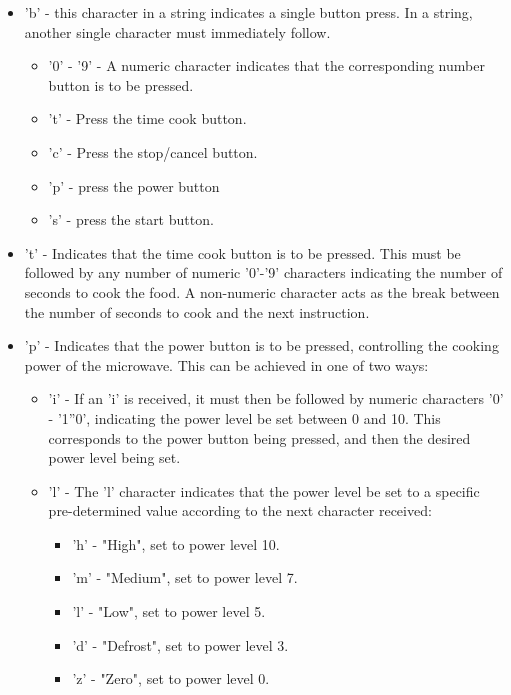 \documentclass[10pt,journal,letterpaper,twocolumn]{IEEEtran}
\begin{document}
\begin{itemize}
	\item 'b' - this character in a string indicates a single button press.  In a string, another single character must immediately follow.
      \begin{itemize}
          \item '0' - '9' - A numeric character indicates that the corresponding number button is to be pressed.
          \item 't' - Press the time cook button.
          \item 'c' - Press the stop/cancel button.
          \item 'p' - press the power button
          \item 's' - press the start button.
      \end{itemize}
    \item 't' - Indicates that the time cook button is to be pressed.  This must be followed by any number of numeric '0'-'9' characters indicating the number of seconds to cook the food.  A non-numeric character acts as the break between the number of seconds to cook and the next instruction.
    \item 'p' - Indicates that the power button is to be pressed, controlling the cooking power of the microwave.  This can be achieved in one of two ways:
    	\begin{itemize}
			\item 'i' - If an 'i' is received, it must then be followed by numeric characters '0' - '1''0', indicating the power level be set between 0 and 10.  This corresponds to the power button being pressed, and then the desired power level being set.
            \item 'l' - The 'l' character indicates that the power level be set to a specific pre-determined value according to the next character received:  
              \begin{itemize}
              		\item 'h' - "High", set to power level 10.
                    \item 'm' - "Medium", set to power level 7.
                    \item 'l' - "Low", set to power level 5.
                    \item 'd' - "Defrost", set to power level 3.
                    \item 'z' - "Zero", set to power level 0.
              \end{itemize}
 		\end{itemize}             

\end{itemize}
\end{document}
